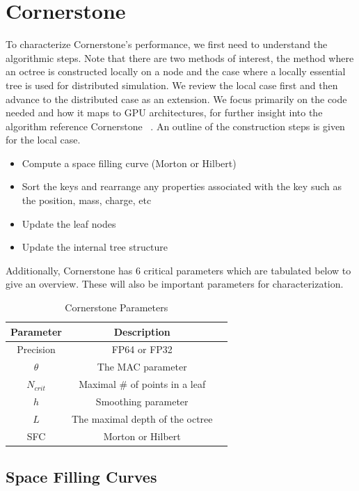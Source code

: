 \section{Cornerstone}
\label{sec:cornerstone}

To characterize Cornerstone's performance, we first need to understand the algorithmic steps. Note that there are two methods of interest, the method where an octree is constructed locally on a node and the case where a locally essential tree is used for distributed simulation. We review the local case first and then advance to the distributed case as an extension. We focus primarily on the code needed and how it maps to GPU architectures, for further insight into the algorithm reference Cornerstone ~\cite{cornerstone}. An outline of the construction steps is given for the local case.
\begin{itemize}
    \item Compute a space filling curve (Morton or Hilbert)
    \item Sort the keys and rearrange any properties associated with the key such as the position, mass, charge, etc
    \item Update the leaf nodes
    \item Update the internal tree structure
\end{itemize}

Additionally, Cornerstone has 6 critical parameters which are tabulated below to give an overview. These will also be important parameters for characterization.

\begin{table}[h!]
    \centering
    \caption{Cornerstone Parameters}
    \label{tab:my_table}
    \begin{tabular}{|c|c|c|}
        \hline
        \textbf{Parameter} & \textbf{Description} \\
        \hline
        Precision & FP64 or FP32 \\
        $\theta$ & The MAC parameter \\
        $N_{crit}$ & Maximal \# of points in a leaf \\ 
        $h$ & Smoothing parameter \\
        $L$ & The maximal depth of the octree \\
        SFC & Morton or Hilbert \\
        \hline
    \end{tabular}
\end{table}

\subsection{Space Filling Curves}

